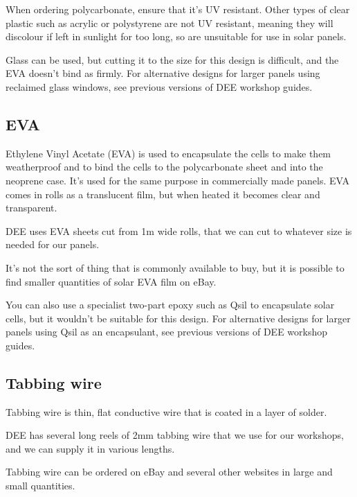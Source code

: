 \documentclass{article}
\theoremstyle{definition}
\theoremstyle{definition}
\theoremstyle{remark}
\begin{document}
    When ordering polycarbonate, ensure that it's UV resistant. Other types of clear plastic such as acrylic or polystyrene are not UV resistant, meaning they will discolour if left in sunlight for too long, so are unsuitable for use in solar panels.

    Glass can be used, but cutting it to the size for this design is difficult, and the EVA doesn't bind as firmly. For alternative designs for larger panels using reclaimed glass windows, see previous versions of DEE workshop guides.
  

  \subsection{EVA} %
  \label{sub:eva}

    Ethylene Vinyl Acetate (EVA) is used to encapsulate the cells to make them weatherproof and to bind the cells to the polycarbonate sheet and into the neoprene case. It's used for the same purpose in commercially made panels. EVA comes in rolls as a translucent film, but when heated it becomes clear and transparent.

    DEE uses EVA sheets cut from 1m wide rolls, that we can cut to whatever size is needed for our panels.

    It's not the sort of thing that is commonly available to buy, but it is possible to find smaller quantities of solar EVA film on eBay.

    You can also use a specialist two-part epoxy such as Qsil to encapsulate solar cells, but it wouldn't be suitable for this design. For alternative designs for larger panels using Qsil as an encapsulant, see previous versions of DEE workshop guides.
  

  \subsection{Tabbing wire} %
  \label{sub:tabbing_wire}

    Tabbing wire is thin, flat conductive wire that is coated in a layer of solder. 

    DEE has several long reels of 2mm tabbing wire that we use for our workshops, and we can supply it in various lengths.

    Tabbing wire can be ordered on eBay and several other websites in large and small quantities. 
  
\end{document}
